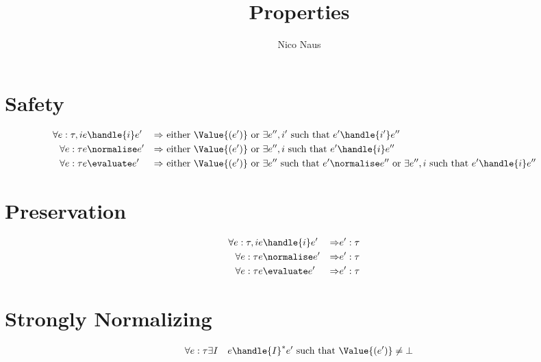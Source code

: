 \documentclass
  [a4paper
  ,justified
  ,nofonts
  ]{tufte-handout}
\title{Properties}
\author{Nico Naus}
\begin{document}
\maketitle

%
%
\section{Safety}

\begin{align*}
  \forall e:\tau,i & e \handle{i} e' &\implies& \text{ either } \Value{(e')} \text{ or } \exists e'',i' \text{ such that } e'\handle{i'}e''&\\
  \forall e:\tau & e \normalise e' &\implies& \text{ either } \Value{(e')} \text{ or } \exists e'',i \text{ such that } e'\handle{i}e''&\\
  \forall e:\tau & e \evaluate e' &\implies& \text{ either } \Value{(e')} \text{ or } \exists e''\text{ such that } e'\normalise e'' \text{ or } \exists e'',i \text{ such that } e'\handle{i}e''&
\end{align*}

\section{Preservation}
\begin{align*}
  \forall e:\tau,i & e \handle{i} e' &\implies& e':\tau&\\
  \forall e:\tau & e \normalise e' &\implies& e':\tau&\\
  \forall e:\tau & e \evaluate e' &\implies& e':\tau&
\end{align*}


\section{Strongly Normalizing}
\begin{align*}
  \forall e:\tau & \exists I & e\handle{I}^* e' \text{ such that } \Value{(e')}\neq\bot
\end{align*}
\end{document}

